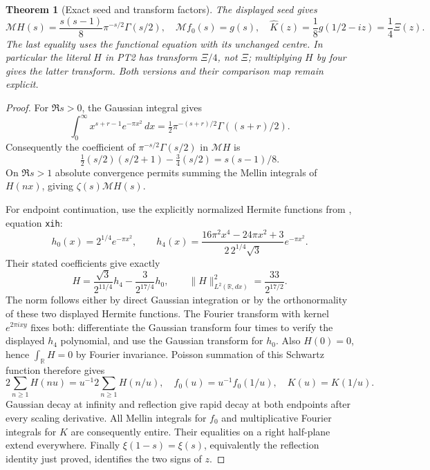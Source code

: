 \documentclass[11pt]{article}
\newtheorem{theorem}{Theorem}[section]
\newcommand{\R}{\mathbb R}\newcommand{\C}{\mathbb C}
\newcommand{\M}{\mathcal M}\newcommand{\E}{\mathcal E}
\begin{document}
\begin{theorem}[Exact seed and transform factors]
The displayed seed gives
\begin{equation}\tag{PT4}
 \M H(s)=\frac{s(s-1)}8\pi^{-s/2}\Gamma(s/2),\quad
 \M f_0(s)=g(s),\quad
 \widehat K(z)=\frac18g(1/2-iz)=\frac14\Xi(z).
\end{equation}
The last equality uses the functional equation with its unchanged
centre. In particular the literal $H$ in PT2 has transform
$\Xi/4$, not $\Xi$; multiplying $H$ by four gives the latter
transform. Both versions and their comparison map remain explicit.
\end{theorem}
\begin{proof}
For $\Re s>0$, the Gaussian integral gives
\[
 \int_0^\infty x^{s+r-1}e^{-\pi x^2}\,dx
  =\tfrac12\pi^{-(s+r)/2}\Gamma((s+r)/2).
\]
Consequently the coefficient of
$\pi^{-s/2}\Gamma(s/2)$ in $\M H$ is
\[
 \tfrac12(s/2)(s/2+1)-\tfrac34(s/2)=s(s-1)/8.
\]
On $\Re s>1$ absolute convergence permits summing the Mellin
integrals of $H(nx)$, giving $\zeta(s)\M H(s)$.

For endpoint continuation, use the explicitly normalized Hermite
functions from \cite{CCM}, equation \texttt{xih}:
\[
 h_0(x)=2^{1/4}e^{-\pi x^2},\qquad
 h_4(x)=\frac{16\pi^2x^4-24\pi x^2+3}{2\,2^{1/4}\sqrt3}
                                  e^{-\pi x^2}.
\]
Their stated coefficients give exactly
\begin{equation}\tag{PT5}
 H=\frac{\sqrt3}{2^{11/4}}h_4-\frac3{2^{17/4}}h_0,
 \qquad \|H\|_{L^2(\R,dx)}^2=\frac{33}{2^{17/2}}.
\end{equation}
The norm follows either by direct Gaussian integration or by the
orthonormality of these two displayed Hermite functions.
The Fourier transform with kernel $e^{2\pi ixy}$ fixes both:
differentiate the Gaussian transform four times to verify the
displayed $h_4$ polynomial, and use the Gaussian transform for $h_0$.
Also $H(0)=0$, hence $\int_\R H=0$ by Fourier invariance.
Poisson summation of this Schwartz function therefore gives
\[
 2\sum_{n\geq1}H(nu)=u^{-1}2\sum_{n\geq1}H(n/u),
 \quad f_0(u)=u^{-1}f_0(1/u),\quad K(u)=K(1/u).
\]
Gaussian decay at infinity and reflection give rapid decay at
both endpoints after every scaling derivative. All Mellin
integrals for $f_0$ and multiplicative Fourier integrals for $K$
are consequently entire. Their equalities on a right half-plane
extend everywhere. Finally $\xi(1-s)=\xi(s)$, equivalently the
reflection identity just proved, identifies the two signs of $z$.
\end{proof}
\end{document}
